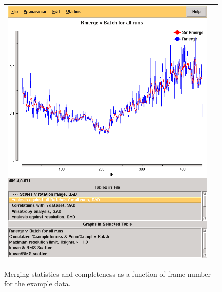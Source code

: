 \documentclass[a4paper, 11pt]{article}
\begin{document}
\begin{figure}
\caption{Merging statistics and completeness as a function of frame
  number for the example data.\label{figure-rmerge-completeness}}
\begin{tabular}{cc}
\includegraphics[scale=0.25]{figures/3qrn-all-rmerge-aimless.png} & 

\end{tabular}
\end{figure}
\end{document}
